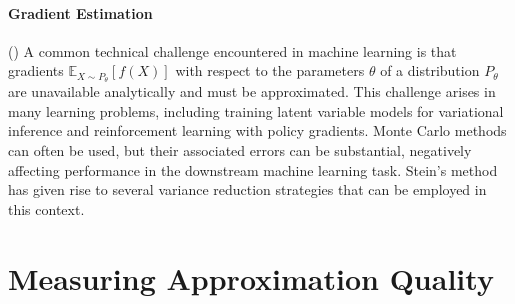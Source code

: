 \documentclass[12pt,paper=letter]{scrreprt}
\begin{document}
\paragraph{Gradient Estimation}
()
A common technical challenge encountered in machine learning is that gradients $\mathbb{E}_{X \sim P_\theta}[f(X)]$ with respect to the parameters $\theta$ of a distribution $P_\theta$ are unavailable analytically and must be approximated. 
This challenge arises in many learning problems, including training latent variable models for variational inference and reinforcement learning with policy gradients. 
Monte Carlo methods can often be used, but their associated errors can be substantial, negatively affecting performance in the downstream machine learning task. 
Stein's method has given rise to several variance reduction strategies that can be employed in this context.

 


\section{Measuring Approximation Quality}
\label{sec:measure} 
\end{document}
